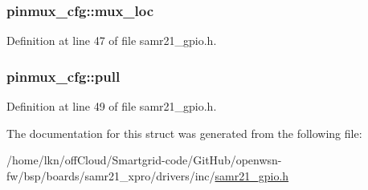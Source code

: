 \subsubsection[{\texorpdfstring{mux\+\_\+loc}{mux_loc}}]{ pinmux\+\_\+cfg\+::mux\+\_\+loc}\hypertarget{structpinmux__cfg_a57d9b76a08ffc0f59967a83cede8dce9}{}\label{structpinmux__cfg_a57d9b76a08ffc0f59967a83cede8dce9}


Definition at line 47 of file samr21\+\_\+gpio.\+h.

\subsubsection[{\texorpdfstring{pull}{pull}}]{ pinmux\+\_\+cfg\+::pull}\hypertarget{structpinmux__cfg_ae653ebc3ee0ea56b5eb553a4f9ac19f9}{}\label{structpinmux__cfg_ae653ebc3ee0ea56b5eb553a4f9ac19f9}


Definition at line 49 of file samr21\+\_\+gpio.\+h.



The documentation for this struct was generated from the following file\+:\begin{DoxyCompactItemize}
\item 
/home/lkn/off\+Cloud/\+Smartgrid-\/code/\+Git\+Hub/openwsn-\/fw/bsp/boards/samr21\+\_\+xpro/drivers/inc/\hyperlink{samr21__gpio_8h}{samr21\+\_\+gpio.\+h}\end{DoxyCompactItemize}
